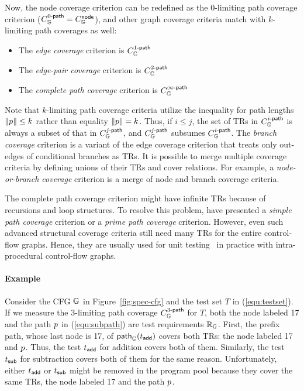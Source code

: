 Now, the node coverage criterion can be redefined as the 0-limiting path
coverage criterion ($C_{\mathbb{G}}^{{0}\textsf{-path}} = C_{\mathbb{G}}^{\textsf{node}}$), and other graph
coverage criteria match with $k$-limiting path coverages as well:
\begin{itemize}
  \item The \textit{edge coverage} criterion is $C_{\mathbb{G}}^{{1}\textsf{-path}}$
  \item The \textit{edge-pair coverage} criterion is $C_{\mathbb{G}}^{{2}\textsf{-path}}$
  \item The \textit{complete path coverage} criterion is
    $C_{\mathbb{G}}^{{\infty}\textsf{-path}}$
\end{itemize}
%
Note that $k$-limiting path coverage criteria utilize the inequality for path
lengths $\lVert{p}\rVert \leq k$ rather than equality $\lVert{p}\rVert = k$.
%
Thus, if $i \leq j$, the set of TRs in $C_{\mathbb{G}}^{{i}\textsf{-path}}$ is always a subset
of that in $C_{\mathbb{G}}^{{j}\textsf{-path}}$, and $C_{\mathbb{G}}^{{j}\textsf{-path}}$ subsumes
$C_{\mathbb{G}}^{{i}\textsf{-path}}$.
%
The \textit{branch coverage} criterion is a variant of the edge coverage
criterion that treats only out-edges of conditional branches as TRs.
%
It is possible to merge multiple coverage criteria by defining unions of their
TRs and cover relations.
%
For example, a \textit{node-or-branch coverage} criterion is a merge
of node and branch coverage criteria.


The complete path coverage criterion might have infinite TRs because of
recursions and loop structures.
%
To resolve this problem, \citet{cov-def} have presented a \textit{simple path
coverage} criterion or a \textit{prime path coverage} criterion.
%
However, even such advanced structural coverage criteria still need many
TRs for the entire control-flow graphs.
%
Hence, they are usually used for unit testing~\cite{unit-test} in practice
with intra-procedural control-flow graphs.


\paragraph{\textbf{Example}}
%
Consider the CFG $\mathbb{G}$ in Figure~\ref{fig:spec-cfg} and the test
set $T$ in (\ref{equ:testset}).
%
If we measure the 3-limiting path coverage $C_{\mathbb{G}}^{{3}\textsf{-path}}$ for
$T$, both the node labeled 17 and the path $p$ in (\ref{equ:subpath}) are
test requirements $\mathbb{R}_{\mathbb{G}}$.
%
First, the prefix path, whose last node is 17, of $\textsf{path}_{\mathbb{G}}(t_{\textsf{add}})$
covers both TRs: the node labeled 17 and $p$.
%
Thus, the test $t_{\textsf{add}}$ for addition covers both of them.
%
Similarly, the test $t_{\textsf{sub}}$ for subtraction covers both of them for the same
reason.
%
Unfortunately, either $t_{\textsf{add}}$ or $t_{\textsf{sub}}$ might be removed in the program
pool because they cover the same TRs, the node labeled 17 and the path $p$.


